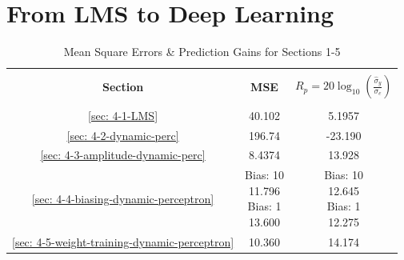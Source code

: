 \documentclass[12pt]{article}
\numberwithin{equation}{section}
\begin{document}
\pagebreak
\section{From LMS to Deep Learning} \label{sec: 4-LMS-to-DL}

		\begin{minipage}[t]{0.45\textwidth}
			\begin{table}[H]
				\centering
				\begin{tabular}{|c|c|c|}
					\hline
					&&\\[-1em]
					\textbf{Section} & \textbf{MSE} & \textbf{$R_p = 20\log_{10}({\frac{\hat{\sigma}_y}{\sigma_e}})$} \\
					&&\\[-1em]
					\hline
					\hline
					\ref{sec: 4-1-LMS}	&	40.102		&	5.1957 \\
					\hline
					\ref{sec: 4-2-dynamic-perc}	&	196.74	&	-23.190 \\
					\hline
					\ref{sec: 4-3-amplitude-dynamic-perc}	&	8.4374		&	13.928 \\
					\hline
					\ref{sec: 4-4-biasing-dynamic-perceptron} 	&	\makecell{ Bias: 10 \\ 11.796 \\ Bias: 1 \\ 13.600 \\}		&	\makecell{ Bias: 10 \\ 12.645 \\ Bias: 1 \\ 12.275 \\} \\
					\hline
					\ref{sec: 4-5-weight-training-dynamic-perceptron}	&	10.360		&	14.174 \\
					\hline
				\end{tabular}
				\captionsetup{justification=centering}
				\caption{Mean Square Errors \& Prediction Gains for Sections 1-5}
				\label{tab: 4-mse-Rp}
			\end{table}
		\end{minipage}%
		\begin{minipage}{0.04\textwidth}
			\hspace*{0.04\textwidth}
		\end{minipage}%
\end{document}

